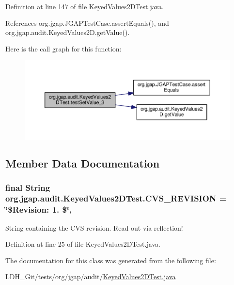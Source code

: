 Definition at line 147 of file Keyed\-Values2\-D\-Test.\-java.



References org.\-jgap.\-J\-G\-A\-P\-Test\-Case.\-assert\-Equals(), and org.\-jgap.\-audit.\-Keyed\-Values2\-D.\-get\-Value().



Here is the call graph for this function\-:
\nopagebreak
\begin{figure}[H]
\begin{center}
\leavevmode
\includegraphics[width=350pt]{classorg_1_1jgap_1_1audit_1_1_keyed_values2_d_test_ac7da5eafb21c6955504df38ad568881a_cgraph}
\end{center}
\end{figure}




\subsection{Member Data Documentation}
\hypertarget{classorg_1_1jgap_1_1audit_1_1_keyed_values2_d_test_a5eefb7a71ea73f03422277ee5c94daf5}{
\subsubsection[{C\-V\-S\-\_\-\-R\-E\-V\-I\-S\-I\-O\-N}]{\setlength{\rightskip}{0pt plus 5cm}final String org.\-jgap.\-audit.\-Keyed\-Values2\-D\-Test.\-C\-V\-S\-\_\-\-R\-E\-V\-I\-S\-I\-O\-N = \char`\"{}\$Revision\-: 1. \$\char`\"{}\hspace{0.3cm}{\ttfamily [static]}, {\ttfamily [private]}}}\label{classorg_1_1jgap_1_1audit_1_1_keyed_values2_d_test_a5eefb7a71ea73f03422277ee5c94daf5}
String containing the C\-V\-S revision. Read out via reflection! 

Definition at line 25 of file Keyed\-Values2\-D\-Test.\-java.



The documentation for this class was generated from the following file\-:\begin{DoxyCompactItemize}
\item 
L\-D\-H\-\_\-\-Git/tests/org/jgap/audit/\hyperlink{_keyed_values2_d_test_8java}{Keyed\-Values2\-D\-Test.\-java}\end{DoxyCompactItemize}
